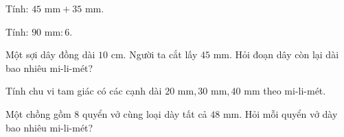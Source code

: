 \begin{ex} %
Tính: $45\text{ mm} + 35\text{ mm}$.
\end{ex}

\begin{ex} %
Tính: $90\text{ mm} : 6$.
\end{ex}

\begin{ex} %
Một sợi dây đồng dài $10\text{ cm}$. Người ta cắt lấy $45\text{ mm}$. Hỏi đoạn dây còn lại dài bao nhiêu mi-li-mét?
\end{ex}

\begin{ex} %
Tính chu vi tam giác có các cạnh dài $20\text{ mm}, 30\text{ mm}, 40\text{ mm}$ theo mi-li-mét.
\end{ex}

\begin{ex} %
Một chồng gồm 8 quyển vở cùng loại dày tất cả $48\text{ mm}$. Hỏi mỗi quyển vở dày bao nhiêu mi-li-mét?
\end{ex}
